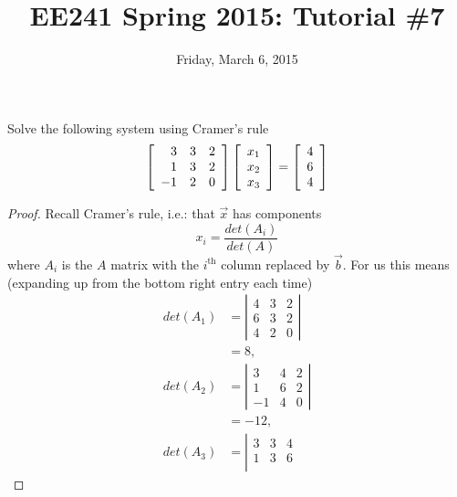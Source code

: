 \documentclass{tutorial}
\begin{document}
\newif\ifsolns

\solnstrue

\title{EE241 Spring 2015: Tutorial \#7}
\date{Friday, March 6, 2015}
\maketitle


\begin{prob} Solve the following system using Cramer's rule
\[
  \left[ \begin{array}{rrr}
     3 & 3 & 2 \\
     1 & 3 & 2 \\
    -1 & 2 & 0
  \end{array} \right]
  \left[ \begin{array}{r}
    x_1 \\ x_2 \\ x_3
  \end{array}\right]
   = \left[ \begin{array}{r}
    4 \\ 6 \\ 4
   \end{array}\right]
\]
\end{prob} \ifsolns \begin{proof}
Recall Cramer's rule, i.e.: that $\vec{x}$ has components
\[
  x_i = \frac{det(A_i)}{det(A)}
\]
where $A_i$ is the $A$ matrix with the $i^{\text{th}}$ column replaced by $\vec{b}$. For us this means (expanding up from the bottom right entry each time)
\begin{align*}
  det(A_1) & = \left| \begin{array}{rrr}
     4 & 3 & 2 \\
     6 & 3 & 2 \\
     4 & 2 & 0
  \end{array} \right| \\
   & = 8, \\
   det(A_2) & = \left| \begin{array}{rrr}
     3 & 4 & 2 \\
     1 & 6 & 2 \\
    -1 & 4 & 0
  \end{array} \right| \\
   & = -12, \\
   det(A_3) & = \left| \begin{array}{rrr}
     3 & 3 & 4 \\
     1 & 3 & 6 \\

\end{array}
\end{align*}
\end{proof}
\end{document}

